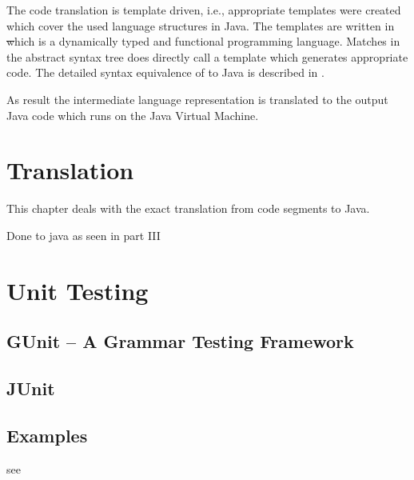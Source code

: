 The code translation is template driven, i.e., appropriate templates
were created which cover the used language structures in Java. The
templates are written in \st which is a dynamically typed and functional
programming language. Matches in the abstract syntax tree does directly
call a template which generates appropriate code. The detailed syntax
equivalence of \ooplss to Java is described in .

As result the intermediate language representation is translated to the
output Java code which runs on the Java Virtual Machine.

\section{Translation}
\label{ctr:translation}
This chapter deals with the exact translation from \ooplss code segments
to Java.

Done to java as seen in part III


\section{Unit Testing}
\subsection{GUnit -- A Grammar Testing Framework}
\subsection{JUnit}

\subsection{Examples}
see 
